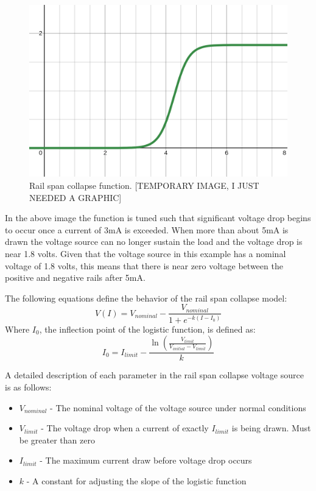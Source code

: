 \documentclass[conference]{IEEEtran}
\begin{document}
    \begin{figure}[htbp]
        \centering
        \includegraphics[width=0.95\linewidth]{rail_collapse_function}
        \caption{Rail span collapse function. [TEMPORARY IMAGE, I JUST NEEDED A GRAPHIC]}
        \label{fig:rail_collapse_function}
    \end{figure}

    In the above image the function is tuned such that significant voltage drop begins to occur once a current of 3mA is exceeded.
    When more than about 5mA is drawn the voltage source can no longer sustain the load and the voltage drop is near 1.8 volts.
    Given that the voltage source in this example has a nominal voltage of 1.8 volts, this means that there is near zero voltage between the positive and negative rails after 5mA\@.

    The following equations define the behavior of the rail span collapse model:
            {\Large
    \[V(I)=V_{nominal}-\frac{V_{nominal}}{1+e^{-k(I-I_0)}}\]
    }
    Where \(I_0\), the inflection point of the logistic function, is defined as:
            {\Large
    \[I_0=I_{limit}-\frac{\ln\left(\frac{V_{limit}}{V_{initial}-V_{limit}}\right)}{k}\]
    }

    A detailed description of each parameter in the rail span collapse voltage source is as follows:

    \begin{itemize}

        \item[] \(V_{nominal}\) - The nominal voltage of the voltage source under normal conditions

        \item[] \(V_{limit}\) - The voltage drop when a current of exactly \(I_{limit}\) is being drawn.
        Must be greater than zero

        \item[] \(I_{limit}\) - The maximum current draw before voltage drop occurs

        \item[] \(k\) - A constant for adjusting the slope of the logistic function

    \end{itemize}
    \vspace{1em}
\end{document}
